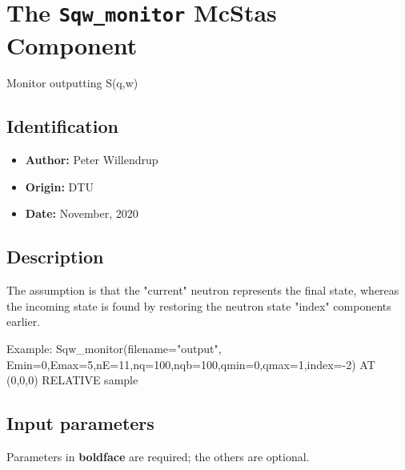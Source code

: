 \section{The \texttt{Sqw\_monitor} McStas Component}
Monitor outputting S(q,w)

\subsection*{Identification}
\begin{itemize}
  \item \textbf{Author:} Peter Willendrup
  \item \textbf{Origin:} DTU
  \item \textbf{Date:} November, 2020
\end{itemize}

\subsection*{Description}
The assumption is that the "current" neutron represents the final state, whereas the incoming state is found by restoring the neutron state "index" components earlier.

Example: Sqw\_monitor(filename="output", Emin=0,Emax=5,nE=11,nq=100,nqb=100,qmin=0,qmax=1,index=-2) AT (0,0,0) RELATIVE sample

\subsection*{Input parameters}
Parameters in \textbf{boldface} are required; the others are optional.

